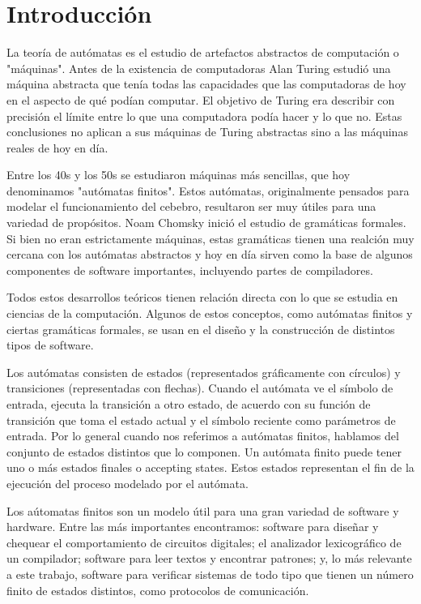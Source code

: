 \section{Introducción}
La teoría de autómatas es el estudio de artefactos abstractos de computación o "máquinas". Antes de la existencia de computadoras Alan Turing estudió una máquina abstracta que tenía todas las capacidades que las computadoras de hoy en el aspecto de qué podían computar. El objetivo de Turing era describir con precisión el límite entre lo que una computadora podía hacer y lo que no. Estas conclusiones no aplican a sus máquinas de Turing abstractas sino a las máquinas reales de hoy en día.

Entre los 40s y los 50s se estudiaron máquinas más sencillas, que hoy denominamos "autómatas finitos". Estos autómatas, originalmente pensados para modelar el funcionamiento del cebebro, resultaron ser muy útiles para una variedad de propósitos. Noam Chomsky inició el estudio de gramáticas formales. Si bien no eran estrictamente máquinas, estas gramáticas tienen una realción muy cercana con los autómatas abstractos y hoy en día sirven como la base de algunos componentes de software importantes, incluyendo partes de compiladores.

Todos estos desarrollos teóricos tienen relación directa con lo que se estudia en ciencias de la computación. Algunos de estos conceptos, como autómatas finitos y ciertas gramáticas formales, se usan en el diseño y la construcción de distintos tipos de software.

Los autómatas consisten de estados (representados gráficamente con círculos) y transiciones (representadas con flechas). Cuando el autómata ve el símbolo de entrada, ejecuta la transición a otro estado, de acuerdo con su función de transición que toma el estado actual y el símbolo reciente como parámetros de entrada. Por lo general cuando nos referimos a autómatas finitos, hablamos del conjunto de estados distintos que lo componen. Un autómata finito puede tener uno o más estados finales o accepting states. Estos estados representan el fin de la ejecución del proceso modelado por el autómata.

Los aútomatas finitos son un modelo útil para una gran variedad de software y hardware. Entre las más importantes encontramos: software para diseñar y chequear el comportamiento de circuitos digitales; el analizador lexicográfico de un compilador; software para leer textos y encontrar patrones; y, lo más relevante a este trabajo, software para verificar sistemas de todo tipo que tienen un número finito de estados distintos, como protocolos de comunicación.

